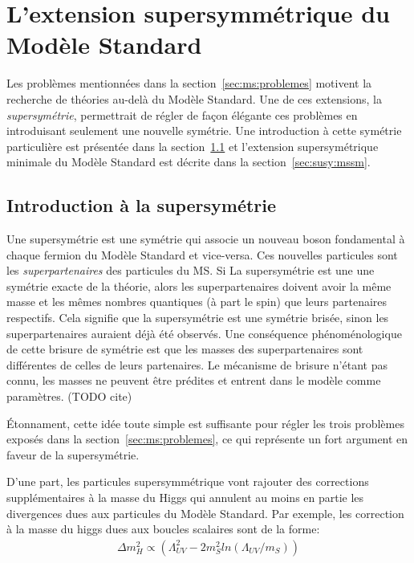 \singlespacing{}
\chapter{L'extension supersymmétrique du Modèle Standard}
\label{sec:susy}
\doublespacing{}

Les problèmes mentionnées dans la section~\ref{sec:ms:problemes}
motivent la recherche de théories au-delà du Modèle Standard. Une de
ces extensions, la \emph{supersymétrie}, permettrait de régler de
façon élégante ces problèmes en introduisant seulement une nouvelle
symétrie. Une introduction à cette symétrie
particulière est présentée dans la section~\ref{sec:susy:th} et
l'extension supersymétrique minimale du Modèle Standard est décrite
dans la section~\ref{sec:susy:mssm}.

\section{Introduction à la supersymétrie}
\label{sec:susy:th}

Une supersymétrie est une symétrie qui associe un nouveau boson
fondamental à chaque fermion du Modèle Standard et vice-versa. Ces
nouvelles particules sont les \emph{superpartenaires} des particules du
MS. Si La supersymétrie est une une symétrie exacte de la théorie,
alors les superpartenaires doivent avoir la même masse et les mêmes
nombres quantiques (à part le spin) que leurs partenaires
respectifs. Cela signifie que la supersymétrie est une symétrie
brisée, sinon les superpartenaires auraient déjà été observés. Une
conséquence phénoménologique de cette brisure de symétrie est que les
masses des superpartenaires sont différentes de celles de leurs
partenaires. Le mécanisme de brisure n'étant pas connu, les masses ne
peuvent être prédites et entrent dans le modèle comme paramètres. (TODO cite)

Étonnament, cette idée toute simple est suffisante pour régler les
trois problèmes exposés dans la section~\ref{sec:ms:problemes}, ce qui
représente un fort argument en faveur de la supersymétrie. 

D'une part, les particules supersymmétrique vont rajouter des
corrections supplémentaires à la masse du Higgs qui annulent au moins
en partie les divergences dues aux particules du Modèle Standard. Par
exemple, les correction à la masse du higgs dues aux boucles scalaires
sont de la forme:
\begin{eqnarray}
  \Delta m_H^2 \propto 
  \left(
  \Lambda_{UV}^2 - 2m^2_S ln(\Lambda_{UV}/m_S)
  \right)
\end{eqnarray}

